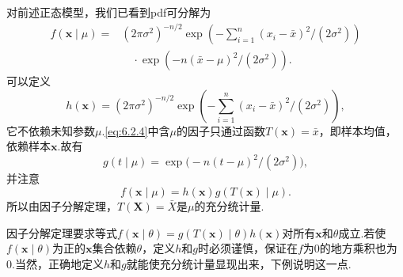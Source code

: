 \begin{example}[续\autoref{ex:6.2.4}]\label{ex:6.2.7}
对前述正态模型，我们已看到pdf可分解为
\begin{equation}\label{eq:6.2.4}
\begin{aligned}
f(\boldsymbol x\mid\mu)={}&(2\pi\sigma^2)^{-n/2}\exp\left(-\sum_{i=1}^n(x_i-\bar x)^2/(2\sigma^2)\right)\\
&\quad\cdot\exp(-n(\bar x-\mu)^2/(2\sigma^2)).
\end{aligned}
\end{equation}
可以定义
$$h(\boldsymbol x)=(2\pi\sigma^2)^{-n/2}\exp\left(-\sum_{i=1}^n(x_i-\bar x)^2/(2\sigma^2)\right),$$
它不依赖未知参数$\mu$.\eqref{eq:6.2.4}中含$\mu$的因子只通过函数$T(\boldsymbol x)=\bar x$，即样本均值，依赖样本$\boldsymbol x$.故有
$$g(t\mid\mu)=\exp\bigl(-n(t-\mu)^2/(2\sigma^2)\bigr),$$
并注意
$$f(\boldsymbol x\mid\mu)=h(\boldsymbol x)g(T(\boldsymbol x)\mid\mu).$$
所以由因子分解定理，$T(\boldsymbol X)=\bar X$是$\mu$的充分统计量.
\end{example}
因子分解定理要求等式$f(\boldsymbol x\mid\theta)=g(T(\boldsymbol x)\mid\theta)h(\boldsymbol x)$对所有$\boldsymbol x$和$\theta$成立.若使$f(\boldsymbol x\mid\theta)$为正的$\boldsymbol x$集合依赖$\theta$，定义$h$和$g$时必须谨慎，保证在$f$为0的地方乘积也为0.当然，正确地定义$h$和$g$就能使充分统计量显现出来，下例说明这一点.
